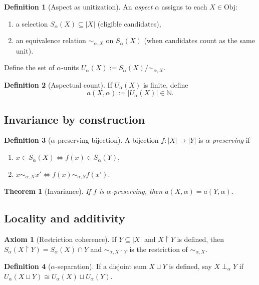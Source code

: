 \documentclass[11pt]{article}
\theoremstyle{definition}
\newtheorem{definition}{Definition}[section]
\newtheorem{axiom}{Axiom}[section]
\theoremstyle{plain}
\newtheorem{theorem}{Theorem}[section]
\theoremstyle{remark}
\newcommand{\Obj}{\mathrm{Obj}}
\newcommand{\bbN}{\mathbb{N}}
\begin{document}
\begin{definition}[Aspect as unitization]\label{def:unitization}
An \emph{aspect} $\alpha$ assigns to each $X\in\Obj$:
\begin{enumerate}[label=(\roman*)]
\item a selection $S_\alpha(X)\subseteq |X|$ (eligible candidates),
\item an equivalence relation $\sim_{\alpha,X}$ on $S_\alpha(X)$ (when candidates count as the same unit).
\end{enumerate}
Define the set of $\alpha$-units $U_\alpha(X):=S_\alpha(X)/\sim_{\alpha,X}$.
\end{definition}

\begin{definition}[Aspectual count]
If $U_\alpha(X)$ is finite, define
\[
a(X,\alpha):=|U_\alpha(X)|\in\bbN.
\]
\end{definition}

\subsection{Invariance by construction}
\begin{definition}[$\alpha$-preserving bijection]
A bijection $f:|X|\to |Y|$ is \emph{$\alpha$-preserving} if
\begin{enumerate}[label=(\roman*)]
\item $x\in S_\alpha(X)\iff f(x)\in S_\alpha(Y)$,
\item $x\sim_{\alpha,X}x'\iff f(x)\sim_{\alpha,Y}f(x')$.
\end{enumerate}
\end{definition}

\begin{theorem}[Invariance]
If $f$ is $\alpha$-preserving, then $a(X,\alpha)=a(Y,\alpha)$.
\end{theorem}

\subsection{Locality and additivity}
\begin{axiom}[Restriction coherence]\label{ax:restriction}
If $Y\subseteq |X|$ and $X\!\upharpoonright\!Y$ is defined, then
$S_\alpha(X\!\upharpoonright\!Y)=S_\alpha(X)\cap Y$ and $\sim_{\alpha,X\upharpoonright Y}$ is the restriction of $\sim_{\alpha,X}$.
\end{axiom}

\begin{definition}[$\alpha$-separation]
If a disjoint sum $X\sqcup Y$ is defined, say $X\perp_\alpha Y$ if
$U_\alpha(X\sqcup Y)\cong U_\alpha(X)\sqcup U_\alpha(Y)$.
\end{definition}
\end{document}
